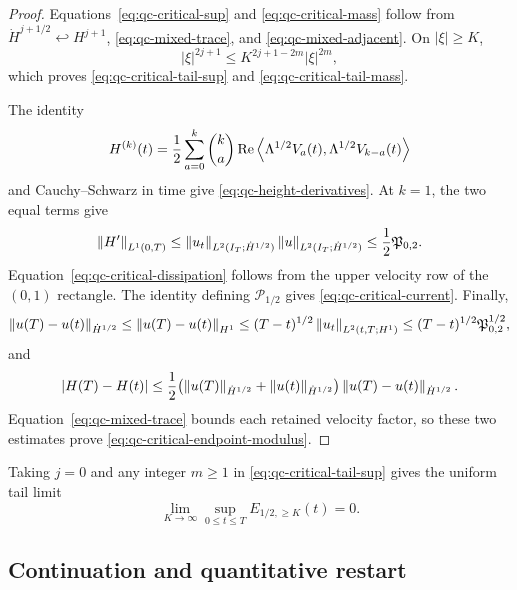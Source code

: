 \begin{proof}
Equations~\eqref{eq:qc-critical-sup} and
\eqref{eq:qc-critical-mass} follow from
\(\dot H^{j+1/2}\hookleftarrow H^{j+1}\),
\eqref{eq:qc-mixed-trace}, and \eqref{eq:qc-mixed-adjacent}.
On \(|\xi|\ge K\),
\[
 |\xi|^{2j+1}\le K^{2j+1-2m}|\xi|^{2m},
\]
which proves \eqref{eq:qc-critical-tail-sup} and
\eqref{eq:qc-critical-tail-mass}.

The identity
\[
 H^{(k)}(t)
 =\frac12\sum_{a=0}^{k}\binom ka
 \operatorname{Re}\left\langle \Lambda^{1/2}V_a(t),\Lambda^{1/2}V_{k-a}(t)\right\rangle
\]
and Cauchy--Schwarz in time give
\eqref{eq:qc-height-derivatives}.  At \(k=1\), the two equal terms give
\[
 \left\lVert H'\right\rVert_{L^1(0,T)}
 \le\left\lVert u_t\right\rVert_{L^2(I_T;\dot H^{1/2})}
     \left\lVert u\right\rVert_{L^2(I_T;\dot H^{1/2})}
 \le\frac12\mathfrak P_{0,2}.
\]
Equation~\eqref{eq:qc-critical-dissipation} follows from the upper velocity
row of the \((0,1)\) rectangle.  The identity defining
\(\mathcal P_{1/2}\) gives \eqref{eq:qc-critical-current}.  Finally,
\[
 \left\lVert u(T)-u(t)\right\rVert_{\dot H^{1/2}}
 \le\left\lVert u(T)-u(t)\right\rVert_{H^1}
 \le(T-t)^{1/2}\left\lVert u_t\right\rVert_{L^2(t,T;H^1)}
 \le(T-t)^{1/2}\mathfrak P_{0,2}^{1/2},
\]
and
\[
 |H(T)-H(t)|
 \le\frac12\bigl(
 \left\lVert u(T)\right\rVert_{\dot H^{1/2}}+\left\lVert u(t)\right\rVert_{\dot H^{1/2}}
 \bigr)\left\lVert u(T)-u(t)\right\rVert_{\dot H^{1/2}}.
\]
Equation~\eqref{eq:qc-mixed-trace} bounds each retained velocity factor, so
these two estimates prove \eqref{eq:qc-critical-endpoint-modulus}.
\end{proof}

Taking \(j=0\) and any integer \(m\ge1\) in
\eqref{eq:qc-critical-tail-sup} gives the uniform tail limit
\begin{equation}
 \lim_{K\to\infty}\sup_{0\le t\le T}
 E_{1/2,\ge K}(t)=0.
 \label{eq:qc-critical-tail-extinction}
\end{equation}

\subsection{Continuation and quantitative restart}

